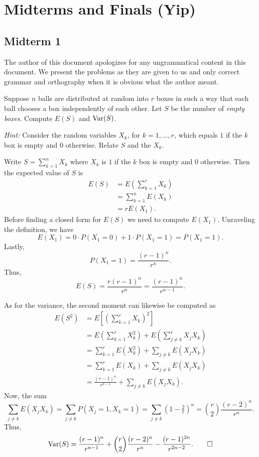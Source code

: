 \section{Midterms and Finals (Yip)}
\subsection{Midterm 1}
The author of this document apologizes for any ungrammatical content in
this document. We present the problems as they are given to us and only
correct grammar and orthography when it is obvious what the author meant.
\begin{problem}
  Suppose \(n\) balls are distributed at random into \(r\) boxes in such a
  way that each ball chooses a box independently of each other. Let \(S\)
  be the number of \emph{empty boxes}. Compute \(E(S)\) and \(\operatorname{Var}(S)\).

  \noindent\emph{Hint:} Consider the random variables \(X_k\), for
  \(k=1,\dotsc,r\), which equals \(1\) if the \(k\) box is
  empty and \(0\) otherwise. Relate \(S\) and the \(X_k\).
\end{problem}
\begin{solution*}
  Write \(S=\sum_{k=1}^n X_k\) where \(X_k\) is \(1\) if the
  \(k\) box is empty and \(0\) otherwise. Then the expected
  value of \(S\) is
  \begin{align*}
    E(S)
    &=E\left(\sum\nolimits_{k=1}^r X_k\right)\\
    &=\sum_{k=1}^n E(X_k)\\
    &=r E(X_1).
  \end{align*}
  Before finding a closed form for \(E(S)\) we need to compute
  \(E(X_1)\). Unraveling the definition, we have
  \[
    E(X_1)=0\cdot P(X_1=0)+1\cdot P(X_1=1)=P(X_1=1).
  \]
  Lastly,
  \[
    P(X_1=1)=\frac{(r-1)^n}{r^n}.
  \]
  Thus,
  \[
    E(S)=\frac{r(r-1)^n}{r^n}=\frac{(r-1)^n}{r^{n-1}}.
  \]

  As for the variance, the second moment can likewise be computed as
  \begin{align*}
    E(S^2)
    &=E\left[\left(\sum\nolimits_{k=1}^r X_k\right)^2\right]\\
    &=E\left(\sum\nolimits_{k=1}^r X_k^2\right)
      +E\left(\sum\nolimits_{j\neq k}^r X_jX_k\right)\\
    &=\sum_{k=1}^r E(X_k^2)+\sum_{j\neq k} E(X_jX_k)\\
    &=\sum_{k=1}^r E(X_k)+\sum_{j\neq k}E(X_jX_k)\\
    &=\frac{(r-1)^n}{r^{n-1}}+\sum_{j\neq k}E(X_jX_k).
  \end{align*}
  Now, the sum
  \[
    \sum_{j\neq k}E(X_jX_k)=%
    \sum_{j\neq k}P(X_j=1,X_k=1)=\sum_{j\neq
      k}\left(1-\tfrac{2}{r}\right)^n=%
    \binom{r}{2}\frac{(r-2)^n}{r^n}.
  \]
  Thus,
  \[
    \Var(S)=%
    \frac{(r-1)^n}{r^{n-1}}+%
    \binom{r}{2}\frac{(r-2)^n}{r^n}-%
    \frac{(r-1)^{2n}}{r^{2n-2}}.\qedhere
  \]
\end{solution*}

